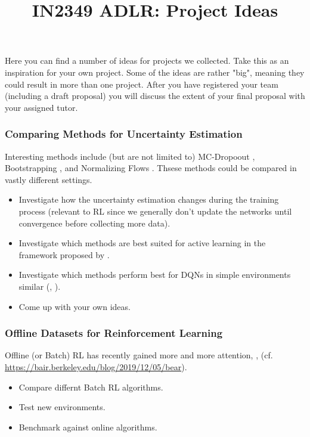 \documentclass[a4paper]{article}
\title{IN2349 ADLR: Project Ideas}
\begin{document}
\maketitle

Here you can find a number of ideas for projects we collected. Take this as an inspiration for your own project. Some of the ideas are rather "big", meaning they could result in more than one project. After you have registered your team (including a draft proposal) you will discuss the extent of your final proposal with your assigned tutor.


\subsubsection{Comparing Methods for Uncertainty Estimation}
Interesting methods include (but are not limited to) MC-Dropoout \cite{Gal2016}, Bootstrapping \cite{Osband2018}, and Normalizing Flows \cite{louizos2017multiplicative}. Thsese methods could be compared in vastly different settings.
\begin{itemize}
  \item Investigate how the uncertainty estimation changes during the training process (relevant to RL since we generally don’t update the networks until convergence before collecting more data).
  \item Investigate which methods are best suited for active learning in the framework proposed by \cite{gal2017active}.
  \item Investigate which methods perform best for DQNs in simple environments similar (\cite{BSuit2020}, \cite{touati2018randomized}).
  \item Come up with your own ideas.
\end{itemize}

\subsubsection{Offline Datasets for Reinforcement Learning}
Offline (or Batch) RL has recently gained more and more attention, \cite{Agarwal2019}, \cite{nair2020} (cf. \url{https://bair.berkeley.edu/blog/2019/12/05/bear}).
\begin{itemize}
  \item Compare differnt Batch RL algorithms.
  \item Test new environments.
  \item Benchmark against online algorithms.
\end{itemize}
\end{document}
